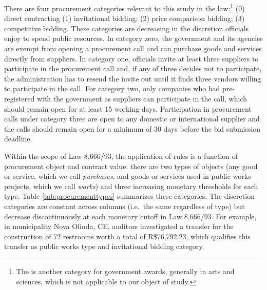 \documentclass[11pt]{article}
\begin{document}
There are four procurement categories relevant to this study in the law:\footnote{The is another category for government awards, generally in arts and sciences, which is not applicable to our object of study.} (0) direct contracting (1) invitational bidding; (2) price comparison bidding; (3) competitive bidding. These categories are decreasing in the discretion officials enjoy to spend public resources. In category zero, the government and its agencies are exempt from opening a procurement call and can purchase goods and services directly from suppliers. In category one, officials invite at least three suppliers to participate in the procurement call and, if any of three decides not to participate, the administration has to resend the invite out until it finds three vendors willing to participate in the call. For category two, only companies who had pre-registered with the government as suppliers can participate in the call, which should remain open for at least 15 working days. Participation in procurement calls under category three are open to any domestic or international supplier and the calls should remain open for a minimum of 30 days before the bid submission deadline.

Within the scope of Law 8,666/93, the application of rules is a function of procurement object and contract value: there are two types of objects (any good or service, which we call \emph{purchases}, and goods or services used in public works projects, which we call \emph{works}) and three increasing monetary thresholds for each type. Table \ref{tab:procurementtypes} summarizes these categories. The discretion categories are constant across columns (i.e.~the same regardless of type) but decrease discontinuously at each monetary cutoff in Law 8,666/93. For example, in municipality Nova Olinda, CE, auditors investigated a transfer for the construction of 72 restrooms worth a total of R\$76,792.23, which qualifies this transfer as public works type and invitational bidding category.


\end{document}
